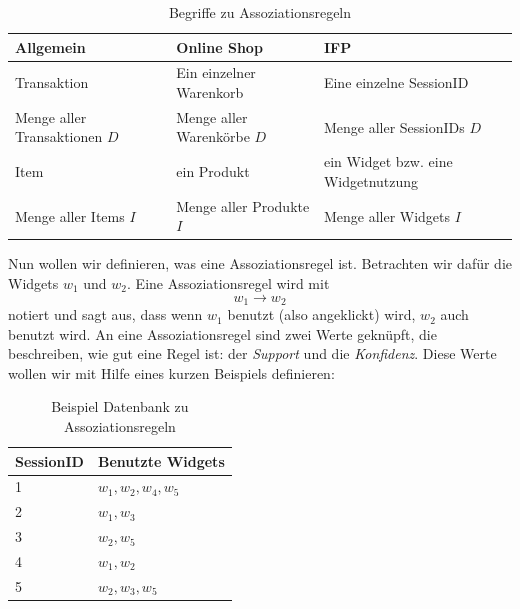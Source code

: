 \begin{table}[htb]
	\begin{center}
		\begin{tabular}{p{4cm}|l|p{5cm}}
			Allgemein & Online Shop & IFP\\
			\hline
			Transaktion & Ein einzelner Warenkorb & Eine einzelne SessionID\\
			\hline
			Menge aller Transaktionen $D$ & Menge aller Warenkörbe $D$ & Menge aller SessionIDs $D$\\
			\hline
			Item & ein Produkt & ein Widget bzw. eine Widgetnutzung\\
			\hline
			Menge aller Items $I$ & Menge aller Produkte $I$ & Menge aller Widgets $I$
		\end{tabular}
		\caption{Begriffe zu Assoziationsregeln}
		\label{tab:begriffe_ar}
	\end{center}
\end{table}

Nun wollen wir definieren, was eine Assoziationsregel ist. Betrachten wir dafür die Widgets $w_1$ und $w_2$. Eine Assoziationsregel wird mit \begin{equation*}w_1 \rightarrow w_2\end{equation*} notiert und sagt aus, dass wenn $w_1$ benutzt (also angeklickt) wird, $w_2$ auch benutzt wird. An eine Assoziationsregel sind zwei Werte geknüpft, die beschreiben, wie \glqq gut\grqq{} eine Regel ist: der \textit{Support} und die \textit{Konfidenz}. Diese Werte wollen wir mit Hilfe eines kurzen Beispiels definieren:\\

		\begin{table}[htb]
	\begin{center}
		\begin{tabular}{|l|l|}
			\hline
			SessionID&Benutzte Widgets\\ \hline
			1& $w_1,w_2,w_4,w_5$\\ \hline
			2& $w_1,w_3$\\ \hline
			3& $w_2,w_5$\\ \hline
			4& $w_1,w_2$\\ \hline
			5& $w_2,w_3,w_5$\\ \hline
		\end{tabular}
		\caption{Beispiel Datenbank zu Assoziationsregeln}
		\label{tab:bsp_ar}
	\end{center}
\end{table}

